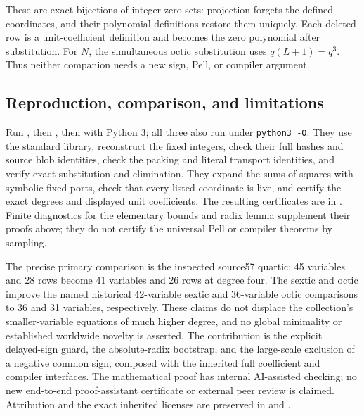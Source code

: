 These are exact bijections of integer zero sets: projection forgets the
defined coordinates, and their polynomial definitions restore them
uniquely.  Each deleted row is a unit-coefficient definition and becomes
the zero polynomial after substitution.  For \(N\), the simultaneous
octic substitution uses \(q(L+1)=q^3\).  Thus neither companion needs
a new sign, Pell, or compiler argument.

\subsection{Reproduction, comparison, and limitations}

Run , then , then
 with Python 3; all three also run under
\texttt{python3 -O}.  They use the standard library, reconstruct the fixed
integers, check their full hashes and source blob identities, check the
packing and literal transport identities, and verify exact substitution
and elimination.  They expand the sums of squares with symbolic fixed
ports, check that every listed coordinate is live, and certify the exact
degrees and displayed unit coefficients.  The resulting certificates
are in .  Finite diagnostics for the elementary bounds
and radix lemma supplement their proofs above; they do not certify the
universal Pell or compiler theorems by sampling.

The precise primary comparison is the inspected source57 quartic:
45 variables and 28 rows become 41 variables and 26 rows at degree four.
The sextic and octic improve the named historical 42-variable sextic and
36-variable octic comparisons to 36 and 31 variables, respectively.
These claims do not displace the collection's smaller-variable equations
of much higher degree, and no global minimality or established worldwide
novelty is asserted.  The contribution is the explicit delayed-sign
guard, the absolute-radix bootstrap, and the large-scale exclusion of a
negative common sign, composed with the inherited full coefficient and
compiler interfaces.  The mathematical proof has internal AI-assisted
checking; no new end-to-end proof-assistant certificate or external peer
review is claimed.  Attribution and the exact inherited licenses are
preserved in  and .
